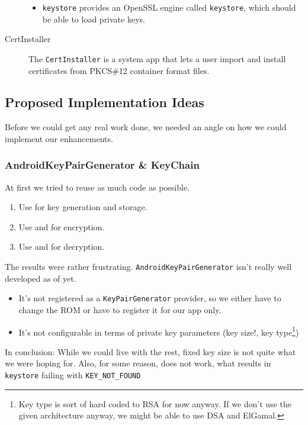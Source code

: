 \documentclass[a4paper]{scrartcl}
\begin{document}
\begin{description}
\begin{itemize}
					\item \texttt{keystore} provides an OpenSSL engine called \texttt{keystore}, which should be able to load private keys. %
				\end{itemize}
			\item [CertInstaller] The \texttt{CertInstaller} is a system app that lets a user import and install certificates from PKCS\#12 container format files.%
		\end{description}

	\subsection{Proposed Implementation Ideas}
		Before we could get any real work done, we needed an angle on how we could implement our enhancements.
		\subsubsection{AndroidKeyPairGenerator \& KeyChain}
			At first we tried to reuse as much code as possible.		
			\begin{enumerate}
				\item Use  for key generation and storage.
				\item Use  and  for encryption.
				\item Use  and  for decryption.
			\end{enumerate}
			The results were rather frustrating. \texttt{AndroidKeyPairGenerator} isn't really well developed as of yet.
			\begin{itemize}
				\item It's not registered as a \texttt{KeyPairGenerator} provider, so we either have to change the ROM or have to register it for our app only.
				\item It's not configurable in terms of private key parameters (key size!, key type\footnote{Key type is sort of hard coded to RSA for now anyway. If we don't use the given architecture anyway, we might be able to use DSA and ElGamal.})
			\end{itemize}
			In conclusion: While we could live with the rest, fixed key size is not quite what we were hoping for. Also, for some reason,  does not work, what results in \texttt{keystore} failing with \texttt{KEY\_NOT\_FOUND}
		
\end{document}
